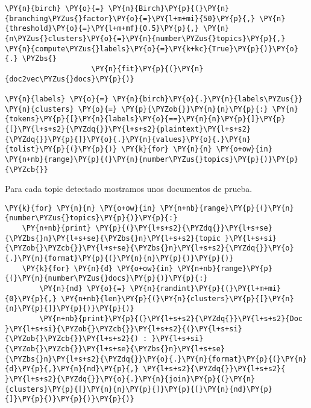     \begin{tcolorbox}[breakable, size=fbox, boxrule=1pt, pad at break*=1mm,colback=cellbackground, colframe=cellborder]
\begin{Verbatim}[commandchars=\\\{\}]
\PY{n}{birch} \PY{o}{=} \PY{n}{Birch}\PY{p}{(}\PY{n}{branching\PYZus{}factor}\PY{o}{=}\PY{l+m+mi}{50}\PY{p}{,} \PY{n}{threshold}\PY{o}{=}\PY{l+m+mf}{0.5}\PY{p}{,} \PY{n}{n\PYZus{}clusters}\PY{o}{=}\PY{n}{number\PYZus{}topics}\PY{p}{,} \PY{n}{compute\PYZus{}labels}\PY{o}{=}\PY{k+kc}{True}\PY{p}{)}\PY{o}{.} \PYZbs{}
                    \PY{n}{fit}\PY{p}{(}\PY{n}{doc2vec\PYZus{}docs}\PY{p}{)}

\PY{n}{labels} \PY{o}{=} \PY{n}{birch}\PY{o}{.}\PY{n}{labels\PYZus{}}
\PY{n}{clusters} \PY{o}{=} \PY{p}{\PYZob{}}\PY{n}{n}\PY{p}{:} \PY{n}{tokens}\PY{p}{[}\PY{n}{labels}\PY{o}{==}\PY{n}{n}\PY{p}{]}\PY{p}{[}\PY{l+s+s2}{\PYZdq{}}\PY{l+s+s2}{plaintext}\PY{l+s+s2}{\PYZdq{}}\PY{p}{]}\PY{o}{.}\PY{n}{values}\PY{o}{.}\PY{n}{tolist}\PY{p}{(}\PY{p}{)} \PY{k}{for} \PY{n}{n} \PY{o+ow}{in} \PY{n+nb}{range}\PY{p}{(}\PY{n}{number\PYZus{}topics}\PY{p}{)}\PY{p}{\PYZcb{}}
\end{Verbatim}
\end{tcolorbox}

    Para cada topic detectado mostramos unos documentos de prueba.

    \begin{tcolorbox}[breakable, size=fbox, boxrule=1pt, pad at break*=1mm,colback=cellbackground, colframe=cellborder]
\begin{Verbatim}[commandchars=\\\{\}]
\PY{k}{for} \PY{n}{n} \PY{o+ow}{in} \PY{n+nb}{range}\PY{p}{(}\PY{n}{number\PYZus{}topics}\PY{p}{)}\PY{p}{:}
    \PY{n+nb}{print} \PY{p}{(}\PY{l+s+s2}{\PYZdq{}}\PY{l+s+se}{\PYZbs{}n}\PY{l+s+se}{\PYZbs{}n}\PY{l+s+s2}{topic }\PY{l+s+si}{\PYZob{}\PYZcb{}}\PY{l+s+se}{\PYZbs{}n}\PY{l+s+s2}{\PYZdq{}}\PY{o}{.}\PY{n}{format}\PY{p}{(}\PY{n}{n}\PY{p}{)}\PY{p}{)}
    \PY{k}{for} \PY{n}{d} \PY{o+ow}{in} \PY{n+nb}{range}\PY{p}{(}\PY{n}{number\PYZus{}docs}\PY{p}{)}\PY{p}{:}
        \PY{n}{nd} \PY{o}{=} \PY{n}{randint}\PY{p}{(}\PY{l+m+mi}{0}\PY{p}{,} \PY{n+nb}{len}\PY{p}{(}\PY{n}{clusters}\PY{p}{[}\PY{n}{n}\PY{p}{]}\PY{p}{)}\PY{p}{)}
        \PY{n+nb}{print}\PY{p}{(}\PY{l+s+s2}{\PYZdq{}}\PY{l+s+s2}{Doc }\PY{l+s+si}{\PYZob{}\PYZcb{}}\PY{l+s+s2}{(}\PY{l+s+si}{\PYZob{}\PYZcb{}}\PY{l+s+s2}{) : }\PY{l+s+si}{\PYZob{}\PYZcb{}}\PY{l+s+se}{\PYZbs{}n}\PY{l+s+se}{\PYZbs{}n}\PY{l+s+s2}{\PYZdq{}}\PY{o}{.}\PY{n}{format}\PY{p}{(}\PY{n}{d}\PY{p}{,}\PY{n}{nd}\PY{p}{,} \PY{l+s+s2}{\PYZdq{}}\PY{l+s+s2}{ }\PY{l+s+s2}{\PYZdq{}}\PY{o}{.}\PY{n}{join}\PY{p}{(}\PY{n}{clusters}\PY{p}{[}\PY{n}{n}\PY{p}{]}\PY{p}{[}\PY{n}{nd}\PY{p}{]}\PY{p}{)}\PY{p}{)}\PY{p}{)}
\end{Verbatim}
\end{tcolorbox}

